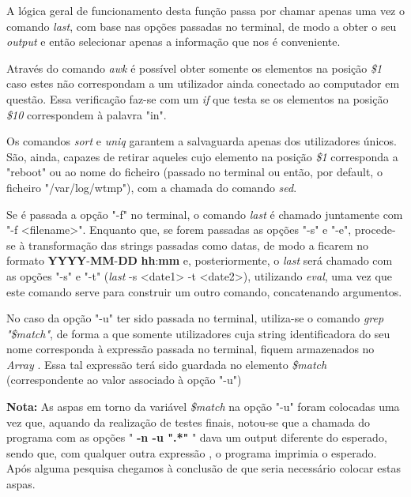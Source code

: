 \documentclass[10pt,portuguese]{article}
\begin{document}
\par A lógica geral de funcionamento desta função passa por chamar apenas uma vez o comando \textit{last}, com base nas opções passadas no terminal, de modo a obter o seu \textit{output} e então selecionar apenas a informação que nos é conveniente.
\par Através do comando \textit{awk} é possível obter somente os elementos na posição \textit{\$1} caso estes não correspondam a um utilizador ainda conectado ao computador em questão. Essa verificação faz-se com um \textit{if} que testa se os elementos na posição \textit{\$10} correspondem à palavra "in".
\par Os comandos \textit{sort} e \textit{uniq} garantem a salvaguarda apenas dos utilizadores únicos. São, ainda, capazes de retirar aqueles cujo elemento na posição \textit{\$1} corresponda a "reboot" ou ao nome do ficheiro (passado no terminal ou então, por default, o ficheiro "/var/log/wtmp"), com a chamada do comando \textit{sed}. 
\par Se é passada a opção "-f" no terminal, o comando \textit{last} é chamado juntamente com "-f <filename>". Enquanto que, se forem passadas as opções "-s" e "-e",  procede-se à transformação das strings passadas como datas, de modo a ficarem no formato \textbf{YYYY}-\textbf{MM}-\textbf{DD} \textbf{hh}:\textbf{mm} e, posteriormente, o \textit{last} será chamado com as opções "-s" e "-t" (\textit{last} -s <date1> -t <date2>), utilizando \textit{eval}, uma vez que este comando serve para construir um outro comando, concatenando argumentos.
\par No caso da opção "-u" ter sido passada no terminal, utiliza-se o comando \textit{grep "\$match"}, de forma a que somente utilizadores cuja string identificadora do seu nome corresponda à expressão passada no terminal, fiquem armazenados no \textit{Array} . Essa tal expressão terá sido guardada no elemento \textit{\$match} (correspondente ao valor associado à opção "-u")
\par \textbf{Nota:} As aspas em torno da variável \textit{\$match} na opção "-u" foram colocadas uma vez que, aquando da realização de testes finais, notou-se que a chamada do programa com as opções "  \textbf{-n -u ".*"  }" dava um output diferente do esperado, sendo que, com qualquer outra expressão , o programa imprimia o esperado. Após alguma pesquisa chegamos à conclusão de que seria necessário colocar estas aspas.
\end{document}
